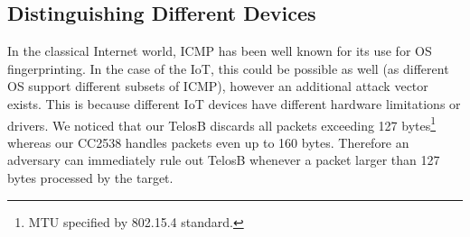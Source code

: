 \subsection{Distinguishing Different Devices}

In the classical Internet world, ICMP has been well known for its use for OS fingerprinting\cite{OsFingerprint}. In the case of the IoT, this could be possible as well (as different OS support different subsets of ICMP), however an additional attack vector exists. This is because different IoT devices have different hardware limitations or drivers. We noticed that our TelosB\cite{TelosB} discards all packets exceeding 127 bytes\footnote{MTU specified by 802.15.4 standard.} whereas our CC2538 handles packets even up to 160 bytes. Therefore an adversary can immediately rule out TelosB whenever a packet larger than 127 bytes processed by the target.

